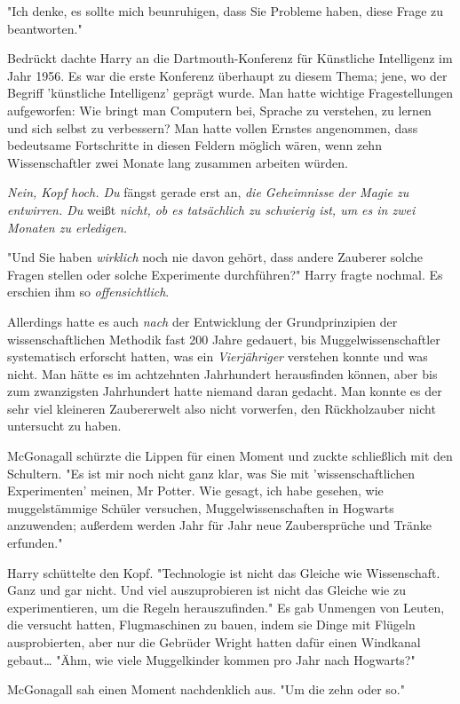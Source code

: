 {"Ich denke, es sollte mich beunruhigen, dass Sie Probleme haben, diese Frage zu beantworten."

Bedrückt dachte Harry an die Dartmouth-Konferenz für Künstliche Intelligenz im Jahr 1956. Es war die erste Konferenz überhaupt zu diesem Thema; jene, wo der Begriff 'künstliche Intelligenz' geprägt wurde. Man hatte wichtige Fragestellungen aufgeworfen: Wie bringt man Computern bei, Sprache zu verstehen, zu lernen und sich selbst zu verbessern? Man hatte vollen Ernstes angenommen, dass bedeutsame Fortschritte in diesen Feldern möglich wären, wenn zehn Wissenschaftler zwei Monate lang zusammen arbeiten würden.

\emph{Nein, Kopf hoch. Du} fängst gerade erst an, \emph{die Geheimnisse der Magie zu entwirren. Du} weißt \emph{nicht, ob es tatsächlich zu schwierig ist, um es in zwei Monaten zu erledigen.}

"Und Sie haben \emph{wirklich} noch nie davon gehört, dass andere Zauberer solche Fragen stellen oder solche Experimente durchführen?" Harry fragte nochmal. Es erschien ihm so \emph{offensichtlich}.

Allerdings hatte es auch \emph{nach} der Entwicklung der Grundprinzipien der wissenschaftlichen Methodik fast 200 Jahre gedauert, bis Muggelwissenschaftler systematisch erforscht hatten, was ein \emph{Vierjähriger} verstehen konnte und was nicht. Man hätte es im achtzehnten Jahrhundert herausfinden können, aber bis zum zwanzigsten Jahrhundert hatte niemand daran gedacht. Man konnte es der sehr viel kleineren Zaubererwelt also nicht vorwerfen, den Rückholzauber nicht untersucht zu haben.

McGonagall schürzte die Lippen für einen Moment und zuckte schließlich mit den Schultern. "Es ist mir noch nicht ganz klar, was Sie mit 'wissenschaftlichen Experimenten' meinen, Mr Potter. Wie gesagt, ich habe gesehen, wie muggelstämmige Schüler versuchen, Muggelwissenschaften in Hogwarts anzuwenden; außerdem werden Jahr für Jahr neue Zaubersprüche und Tränke erfunden."

Harry schüttelte den Kopf. "Technologie ist nicht das Gleiche wie Wissenschaft. Ganz und gar nicht. Und viel auszuprobieren ist nicht das Gleiche wie zu experimentieren, um die Regeln herauszufinden." Es gab Unmengen von Leuten, die versucht hatten, Flugmaschinen zu bauen, indem sie Dinge mit Flügeln ausprobierten, aber nur die Gebrüder Wright hatten dafür einen Windkanal gebaut… "Ähm, wie viele Muggelkinder kommen pro Jahr nach Hogwarts?"

McGonagall sah einen Moment nachdenklich aus. "Um die zehn oder so."

}
